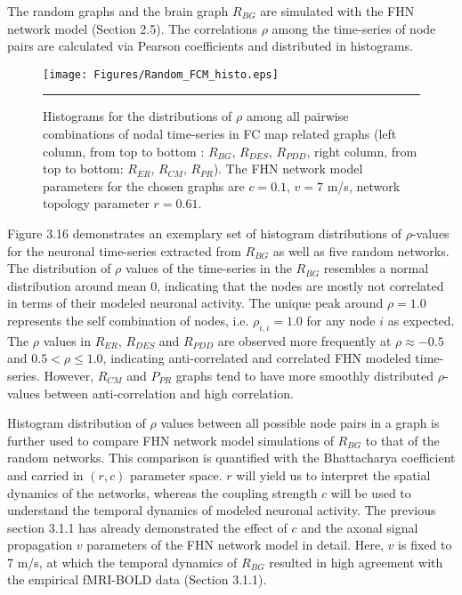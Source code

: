 The random graphs  and the brain graph $R_{BG}$ are simulated with the FHN network model (Section 2.5). The correlations $\rho$ among the time-series of node pairs are calculated via Pearson coefficients and distributed in histograms.
 
\begin{figure}[htbp]
 
  \centering
	 \texttt{[image: Figures/Random\_FCM\_histo.eps]}
	 \rule{35em}{0.5pt}
  \caption[Histogram Comparison, FCM]{Histograms for the  distributions of $\rho$ among all pairwise combinations of nodal time-series in FC map related graphs (left column, from top to bottom : $R_{BG}$, $R_{DES}$, $R_{PDD}$, right column, from top to bottom: $R_{ER}$, $R_{CM}$, $R_{PR}$).  The FHN network model parameters for the chosen graphs are $c=0.1$, $v=7$ m/s, network topology parameter $r=0.61$. } 
    \label{fig:Histogram Comparison, FCM}
 	
\end{figure}  


Figure 3.16 demonstrates an exemplary set of histogram distributions of $\rho$-values for the neuronal time-series extracted from $R_{BG}$  as well as five random networks. The distribution of $\rho$ values of the time-series in the $R_{BG}$ resembles a normal distribution around mean 0, indicating that the nodes are mostly not correlated in terms of their modeled neuronal activity. The unique peak around $\rho=1.0$ represents the self combination of nodes, i.e. $\rho_{i,i}=1.0$ for any node $i$ as expected. The $\rho$ values in $R_{ER}$, $R_{DES}$ and $R_{PDD}$ are observed more frequently at $\rho \approx -0.5 $ and $0.5 <  \rho \leq 1.0 $, indicating anti-correlated and correlated FHN modeled time-series. However, $R_{CM}$ and $P_{PR}$ graphs tend to have more smoothly distributed $\rho$-values between anti-correlation and high correlation.  



Histogram distribution of $\rho$ values between all possible node pairs in a graph is further used to compare FHN network model simulations of $R_{BG}$ to that of the random networks. This comparison is quantified with the Bhattacharya coefficient and carried in $(r,c)$ parameter space. $r$ will yield us to interpret the spatial dynamics of the networks, whereas the coupling strength $c$ will be used to understand the temporal dynamics of modeled neuronal activity. The previous section 3.1.1 has already demonstrated the effect of $c$ and the axonal signal propagation $v$ parameters of the FHN network model in detail. Here, $v$ is fixed to 7 m/s, at which the temporal dynamics of $R_{BG}$ resulted in high agreement with the empirical fMRI-BOLD data (Section 3.1.1).  


